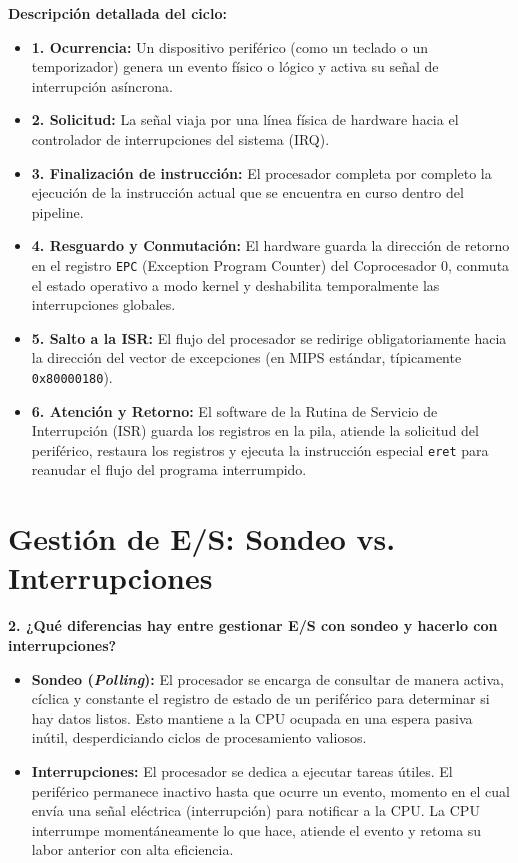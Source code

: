 \documentclass[12pt,a4paper]{article}
\begin{document}
\vspace{0.3cm}
\textbf{Descripción detallada del ciclo:}
\begin{itemize}
    \item \textbf{1. Ocurrencia:} Un dispositivo periférico (como un teclado o un temporizador) genera un evento físico o lógico y activa su señal de interrupción asíncrona. 
    \item \textbf{2. Solicitud:} La señal viaja por una línea física de hardware hacia el controlador de interrupciones del sistema (IRQ). 
    \item \textbf{3. Finalización de instrucción:} El procesador completa por completo la ejecución de la instrucción actual que se encuentra en curso dentro del pipeline. 
    \item \textbf{4. Resguardo y Conmutación:} El hardware guarda la dirección de retorno en el registro \texttt{EPC} (Exception Program Counter) del Coprocesador 0, conmuta el estado operativo a modo kernel y deshabilita temporalmente las interrupciones globales. 
    \item \textbf{5. Salto a la ISR:} El flujo del procesador se redirige obligatoriamente hacia la dirección del vector de excepciones (en MIPS estándar, típicamente \texttt{0x80000180}). 
    \item \textbf{6. Atención y Retorno:} El software de la Rutina de Servicio de Interrupción (ISR) guarda los registros en la pila, atiende la solicitud del periférico, restaura los registros y ejecuta la instrucción especial \texttt{eret} para reanudar el flujo del programa interrumpido. 
\end{itemize}


\section{Gestión de E/S: Sondeo vs. Interrupciones} 
\textbf{2. ¿Qué diferencias hay entre gestionar E/S con sondeo y hacerlo con interrupciones?} 

\begin{itemize}
    \item \textbf{Sondeo (\textit{Polling}):} El procesador se encarga de consultar de manera activa, cíclica y constante el registro de estado de un periférico para determinar si hay datos listos. Esto mantiene a la CPU ocupada en una espera pasiva inútil, desperdiciando ciclos de procesamiento valiosos. 
    \item \textbf{Interrupciones:} El procesador se dedica a ejecutar tareas útiles. El periférico permanece inactivo hasta que ocurre un evento, momento en el cual envía una señal eléctrica (interrupción) para notificar a la CPU. La CPU interrumpe momentáneamente lo que hace, atiende el evento y retoma su labor anterior con alta eficiencia. 
\end{itemize}
\end{document}
